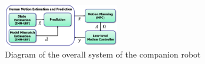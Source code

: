 \documentclass[journal]{IEEEtran}
\DeclareRobustCommand{\clnote}[1]{\ifthenelse{\boolean{include-notes}}%
{\textcolor{orange}{\textbf{CL: #1}}}{}}
\begin{document}
    
	\begin{figure}
		\centering		
		\includegraphics[width=0.45\textwidth]{figures/block_diagram}		
		\caption{Diagram of the overall system of the companion robot} 
		\label{fig:block}
	\end{figure}
    
\end{document}

